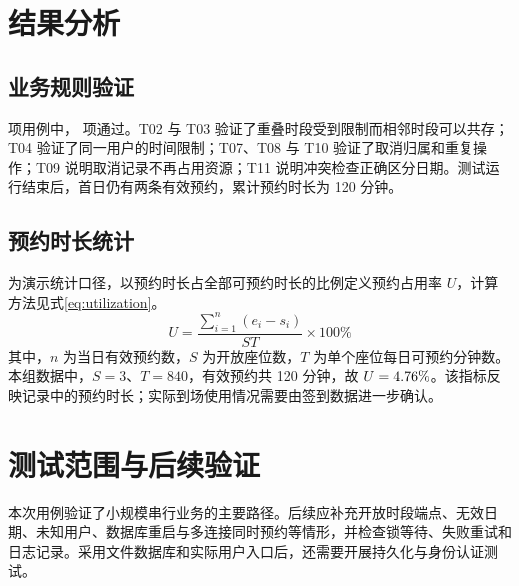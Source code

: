 \section{结果分析}
\subsection{业务规则验证}
\SampleTestCount{} 项用例中，\SamplePassedCount{} 项通过。T02 与 T03 验证了重叠时段受到限制而相邻时段可以共存；T04 验证了同一用户的时间限制；T07、T08 与 T10 验证了取消归属和重复操作；T09 说明取消记录不再占用资源；T11 说明冲突检查正确区分日期。测试运行结束后，首日仍有两条有效预约，累计预约时长为 120 分钟。

\subsection{预约时长统计}
为演示统计口径，以预约时长占全部可预约时长的比例定义预约占用率 $U$，计算方法见式\eqref{eq:utilization}。
\begin{equation}
  U = \frac{\displaystyle\sum_{i=1}^{n}(e_i-s_i)}{S T}\times 100\%
  \label{eq:utilization}
\end{equation}
其中，$n$ 为当日有效预约数，$S$ 为开放座位数，$T$ 为单个座位每日可预约分钟数。本组数据中，$S=3$、$T=840$，有效预约共 120 分钟，故 $U=4.76{}\%$。该指标反映记录中的预约时长；实际到场使用情况需要由签到数据进一步确认。

\section{测试范围与后续验证}
本次用例验证了小规模串行业务的主要路径。后续应补充开放时段端点、无效日期、未知用户、数据库重启与多连接同时预约等情形，并检查锁等待、失败重试和日志记录。采用文件数据库和实际用户入口后，还需要开展持久化与身份认证测试。
